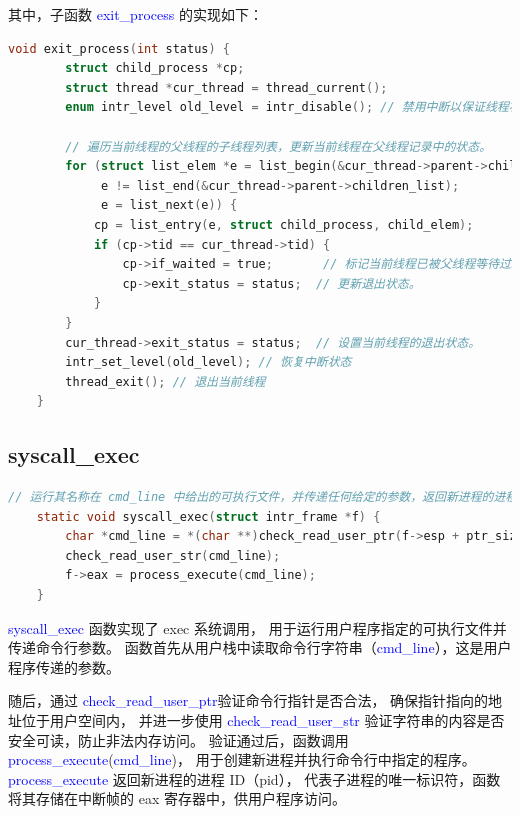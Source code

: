 \documentclass[14pt,a4paper,UTF8,twoside]{article}
\renewcommand{\texttt}[1]{\textcolor{blue}{\ttfamily #1}}
\begin{document}
\vspace{0.8cm}

其中，子函数 \texttt{exit\_process} 的实现如下：

\begin{lstlisting}[language=C]
    void exit_process(int status) {
        struct child_process *cp;
        struct thread *cur_thread = thread_current();
        enum intr_level old_level = intr_disable(); // 禁用中断以保证线程状态更新的安全性。
    
        // 遍历当前线程的父线程的子线程列表，更新当前线程在父线程记录中的状态。
        for (struct list_elem *e = list_begin(&cur_thread->parent->children_list);
             e != list_end(&cur_thread->parent->children_list);
             e = list_next(e)) {
            cp = list_entry(e, struct child_process, child_elem);
            if (cp->tid == cur_thread->tid) {
                cp->if_waited = true;       // 标记当前线程已被父线程等待过。
                cp->exit_status = status;  // 更新退出状态。
            }
        }
        cur_thread->exit_status = status;  // 设置当前线程的退出状态。
        intr_set_level(old_level); // 恢复中断状态
        thread_exit(); // 退出当前线程
    }
\end{lstlisting}

\subsection{syscall\_exec}

\begin{lstlisting}[language=C]
    // 运行其名称在 cmd_line 中给出的可执行文件，并传递任何给定的参数，返回新进程的进程ID(pid)
    static void syscall_exec(struct intr_frame *f) {
        char *cmd_line = *(char **)check_read_user_ptr(f->esp + ptr_size, ptr_size);
        check_read_user_str(cmd_line);
        f->eax = process_execute(cmd_line);
    }
\end{lstlisting}

\vspace{0.7cm}

\begin{ctt}
    \texttt{syscall\_exec} 函数实现了 exec 系统调用，
    用于运行用户程序指定的可执行文件并传递命令行参数。
    函数首先从用户栈中读取命令行字符串（\texttt{cmd\_line}），这是用户程序传递的参数。

    \vspace{0.4cm}

    随后，通过 \texttt{check\_read\_user\_ptr}验证命令行指针是否合法，
    确保指针指向的地址位于用户空间内，
    并进一步使用 \texttt{check\_read\_user\_str} 验证字符串的内容是否安全可读，防止非法内存访问。
    验证通过后，函数调用 \texttt{process\_execute}(\texttt{cmd\_line})，
    用于创建新进程并执行命令行中指定的程序。\texttt{process\_execute} 返回新进程的进程 ID（pid），
    代表子进程的唯一标识符，函数将其存储在中断帧的 eax 寄存器中，供用户程序访问。
\end{ctt}
\end{document}
